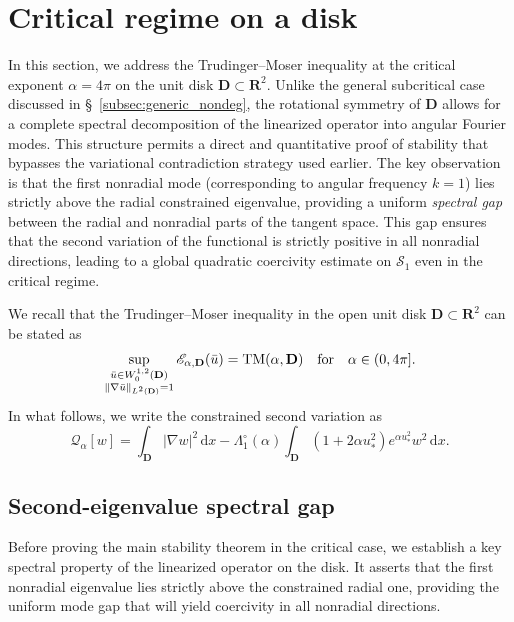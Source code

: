 \documentclass[reqno,11pt]{amsart}
\theoremstyle{definition}
\newcommand{\ud}{\,\mathrm{d}}
\begin{document}
\section{Critical regime on a disk}\label{sec:critical_regime}
In this section, we address the Trudinger--Moser inequality at the critical exponent
$\alpha=4\pi$ on the unit disk $\mathbf{D}\subset\mathbf{R}^2$.
Unlike the general subcritical case discussed in \S~\ref{subsec:generic_nondeg},
the rotational symmetry of $\mathbf{D}$ allows for a complete spectral decomposition
of the linearized operator into angular Fourier modes.
This structure permits a direct and quantitative proof of stability that bypasses
the variational contradiction strategy used earlier.
The key observation is that the first nonradial mode (corresponding to angular frequency
$k=1$) lies strictly above the radial constrained eigenvalue, providing a uniform
\emph{spectral gap} between the radial and nonradial parts of the tangent space.
This gap ensures that the second variation of the functional is strictly positive in
all nonradial directions, leading to a global quadratic coercivity estimate on
$\mathcal{S}_1$ even in the critical regime.

We recall that the Trudinger--Moser inequality in the open unit disk $\mathbf{D}\subset \mathbf{R}^2$ can be stated as
\[\sup_{\substack{\bar{u} \in W_0^{1,2}(\mathbf{D})\\ \|{\nabla \bar{u}}\|_{L^2(\mathbf{D})}=1}} {\mathscr{E}_{\alpha,\mathbf{D}}(\bar{u})}= {\rm TM}(\alpha,\mathbf{D}) \quad {\rm for} \quad \alpha\in (0,4\pi].
\]
In what follows, we write the constrained second variation as
\begin{equation}\label{eq:Qalpha-disk}
\mathscr{Q}_\alpha[w]=\int_{\mathbf{D}}|\nabla w|^2\ud x-\Lambda_1^\circ(\alpha)\int_{\mathbf{D}}(1+2\alpha u_*^2)e^{\alpha u_*^2}w^2\ud x.
\end{equation}

\subsection{Second-eigenvalue spectral gap}\label{subsec:second_eigenvalue}
Before proving the main stability theorem in the critical case, we establish a key
spectral property of the linearized operator on the disk.
It asserts that the first nonradial eigenvalue lies strictly above the constrained radial one,
providing the uniform mode gap that will yield coercivity in all nonradial directions.
\end{document}
